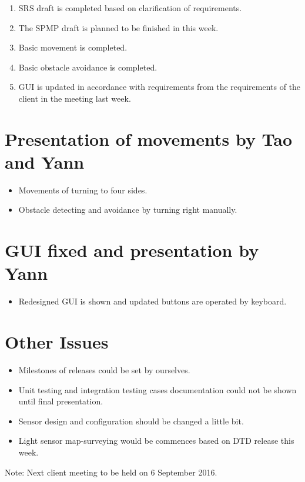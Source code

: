 \documentclass[11pt, a4paper]{article}
\begin{document}
\begin{enumerate}
\item SRS draft is completed based on clarification of requirements.
\item The SPMP draft is planned to be finished in this week.
\item Basic movement is completed.
\item Basic obstacle avoidance is completed.
\item GUI is updated in accordance with requirements from the requirements of the client in the meeting last week.
\end{enumerate}

\section{Presentation of movements by Tao and Yann}

\begin{itemize}
\item Movements of turning to four sides.
\item Obstacle detecting and avoidance by turning right manually.
\end{itemize}

\section{GUI fixed and presentation by Yann}

\begin{itemize}
\item Redesigned GUI is shown and updated buttons are operated by keyboard.
\end{itemize}

\section{Other Issues}
\begin{itemize}
\item Milestones of releases could be set by ourselves.
\item Unit testing and integration testing cases documentation could not be shown until final presentation.
\item Sensor design and configuration should be changed a little bit.
\item Light sensor map-surveying would be commences based on DTD release this week.
\end{itemize}

\vspace*{10pt}
\noindent Note: Next client meeting to be held on 6 September 2016.
\end{document}
